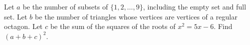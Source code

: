 Let $a$ be the number of subsets of $\{1,2,\ldots,9\}$, including the empty set and full set. Let $b$ be the number of triangles whose vertices are vertices of a regular octagon. Let $c$ be the sum of the squares of the roots of $x^2=5x-6$. Find $(a+b+c)^2$.

